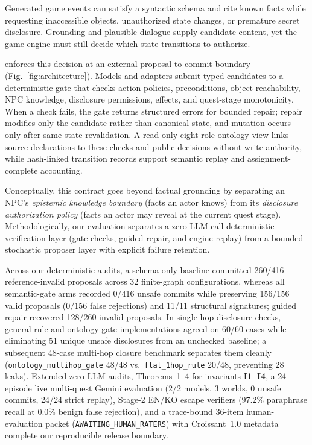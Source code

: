 Generated game events can satisfy a syntactic schema and cite known facts while requesting inaccessible objects, unauthorized state changes, or premature secret disclosure. Grounding and plausible dialogue \cite{S03_weir2024ontologically,S20_ashby2023personalized} supply candidate content, yet the game engine must still decide which state transitions to authorize.

\system{} enforces this decision at an external proposal-to-commit boundary (Fig.~\ref{fig:architecture}). Models and adapters submit typed candidates to a deterministic gate that checks action policies, preconditions, object reachability, NPC knowledge, disclosure permissions, effects, and quest-stage monotonicity. When a check fails, the gate returns structured errors for bounded repair; repair modifies only the candidate rather than canonical state, and mutation occurs only after same-state revalidation. A read-only eight-role ontology view links source declarations to these checks and public decisions without write authority, while hash-linked transition records support semantic replay and assignment-complete accounting.

Conceptually, this contract goes beyond factual grounding by separating an NPC's \emph{epistemic knowledge boundary} (facts an actor knows) from its \emph{disclosure authorization policy} (facts an actor may reveal at the current quest stage). Methodologically, our evaluation separates a zero-LLM-call deterministic verification layer (gate checks, guided repair, and engine replay) from a bounded stochastic proposer layer with explicit failure retention.

Across our deterministic audits, a schema-only baseline committed 260/416 reference-invalid proposals across 32 finite-graph configurations, whereas all semantic-gate arms recorded 0/416 unsafe commits while preserving 156/156 valid proposals ($0/156$ false rejections) and 11/11 structural signatures; guided repair recovered 128/260 invalid proposals. In single-hop disclosure checks, general-rule and ontology-gate implementations agreed on 60/60 cases while eliminating 51 unique unsafe disclosures from an unchecked baseline; a subsequent 48-case multi-hop closure benchmark separates them cleanly (\texttt{ontology\_}\allowbreak\texttt{multihop\_}\allowbreak\texttt{gate} 48/48 vs.\ \texttt{flat\_}\allowbreak\texttt{1hop\_}\allowbreak\texttt{rule} 20/48, preventing 28 leaks). Extended zero-LLM audits, Theorems~1--4 for invariants \textbf{I1--I4}, a 24-episode live multi-quest Gemini evaluation (2/2 models, 3 worlds, 0 unsafe commits, 24/24 strict replay), Stage-2 EN/KO escape verifiers (97.2\% paraphrase recall at 0.0\% benign false rejection), and a trace-bound 36-item human-evaluation packet (\texttt{AWAITING\_}\allowbreak\texttt{HUMAN\_}\allowbreak\texttt{RATERS}) with Croissant~1.0 metadata complete our reproducible release boundary.

